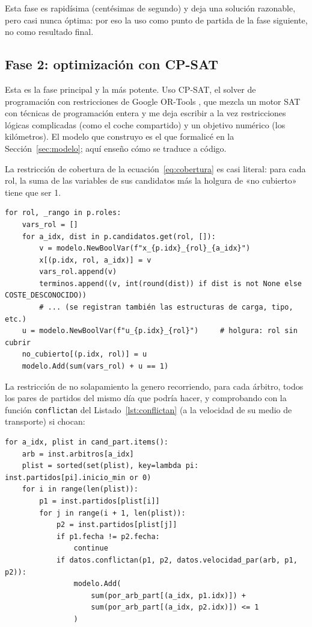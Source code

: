 \documentclass[11pt,a4paper,spanish]{book}
\numberwithin{equation}{chapter}
\numberwithin{figure}{chapter}
\numberwithin{table}{chapter}
\begin{document}
Esta fase es rapidísima (centésimas de segundo) y deja una solución razonable, pero casi nunca óptima: por eso la uso como punto de partida de la fase siguiente, no como resultado final.

\subsection{Fase 2: optimización con CP-SAT}

Esta es la fase principal y la más potente. Uso CP-SAT, el solver de programación con restricciones de Google OR-Tools \cite{cpsat}, que mezcla un motor SAT con técnicas de programación entera y me deja escribir a la vez restricciones lógicas complicadas (como el coche compartido) y un objetivo numérico (los kilómetros). El modelo que construyo es el que formalicé en la Sección~\ref{sec:modelo}; aquí enseño cómo se traduce a código.

La restricción de cobertura de la ecuación~\eqref{eq:cobertura} es casi literal: para cada rol, la suma de las variables de sus candidatos más la holgura de «no cubierto» tiene que ser 1.

\begin{lstlisting}[caption={Variables y restricción de cobertura por rol (\texttt{cpsat.py}).},label={lst:cpsat-cobertura}]
for rol, _rango in p.roles:
    vars_rol = []
    for a_idx, dist in p.candidatos.get(rol, []):
        v = modelo.NewBoolVar(f"x_{p.idx}_{rol}_{a_idx}")
        x[(p.idx, rol, a_idx)] = v
        vars_rol.append(v)
        terminos.append((v, int(round(dist)) if dist is not None else COSTE_DESCONOCIDO))
        # ... (se registran también las estructuras de carga, tipo, etc.)
    u = modelo.NewBoolVar(f"u_{p.idx}_{rol}")     # holgura: rol sin cubrir
    no_cubierto[(p.idx, rol)] = u
    modelo.Add(sum(vars_rol) + u == 1)
\end{lstlisting}

La restricción de no solapamiento la genero recorriendo, para cada árbitro, todos los pares de partidos del mismo día que podría hacer, y comprobando con la función \texttt{conflictan} del Listado~\ref{lst:conflictan} (a la velocidad de su medio de transporte) si chocan:

\begin{lstlisting}[caption={Restricción de no solapamiento horario por árbitro (\texttt{cpsat.py}).},label={lst:cpsat-solape}]
for a_idx, plist in cand_part.items():
    arb = inst.arbitros[a_idx]
    plist = sorted(set(plist), key=lambda pi: inst.partidos[pi].inicio_min or 0)
    for i in range(len(plist)):
        p1 = inst.partidos[plist[i]]
        for j in range(i + 1, len(plist)):
            p2 = inst.partidos[plist[j]]
            if p1.fecha != p2.fecha:
                continue
            if datos.conflictan(p1, p2, datos.velocidad_par(arb, p1, p2)):
                modelo.Add(
                    sum(por_arb_part[(a_idx, p1.idx)]) +
                    sum(por_arb_part[(a_idx, p2.idx)]) <= 1
                )
\end{lstlisting}
\end{document}
